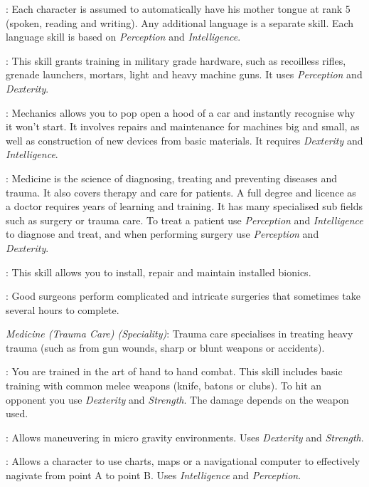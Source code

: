 : Each character is assumed to automatically have his mother
tongue at rank 5 (spoken, reading and writing). Any additional language is a
separate skill. Each language skill is based on \emph{Perception} and
\emph{Intelligence}.

: This skill grants training in military grade hardware,
such as recoilless rifles, grenade launchers, mortars, light and heavy machine
guns. It uses \emph{Perception} and \emph{Dexterity}.

: Mechanics allows you to pop open a hood of a car and instantly
recognise why it won't start. It involves repairs and maintenance for machines
big and small, as well as construction of new devices from basic materials. It
requires \emph{Dexterity} and \emph{Intelligence}.

: Medicine is the science of diagnosing, treating and
preventing diseases and trauma. It also covers therapy and care for patients.
A full degree and licence as a doctor requires years of learning and training.
It has many specialised sub fields such as surgery or trauma care. To treat a
patient use \emph{Perception} and \emph{Intelligence} to diagnose and treat,
and when performing surgery use \emph{Perception} and \emph{Dexterity}.

: This skill allows you to install, repair
and maintain installed bionics.

: Good surgeons perform complicated and
intricate surgeries that sometimes take several hours to complete.

\emph{Medicine (Trauma Care) (Speciality)}: Trauma care specialises in treating
heavy trauma (such as from gun wounds, sharp or blunt weapons or accidents).

: You are trained in the art of hand to hand combat. This
skill includes basic training with common melee weapons (knife, batons or
clubs). To hit an opponent you use \emph{Dexterity} and \emph{Strength}.
The damage depends on the weapon used.

: Allows maneuvering in micro gravity environments. Uses
\emph{Dexterity} and \emph{Strength}.

: Allows a character to use charts, maps or a navigational
computer to effectively nagivate from point A to point B. Uses
\emph{Intelligence} and \emph{Perception}.

